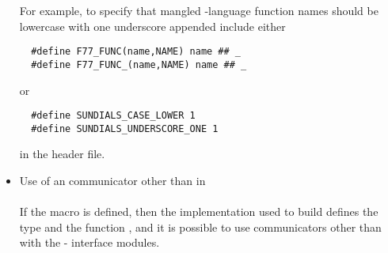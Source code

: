 \begin{itemize}
  For example, to specify that mangled {\C}-language function names
  should be lowercase with one underscore appended include either
\begin{verbatim}
  #define F77_FUNC(name,NAME) name ## _
  #define F77_FUNC_(name,NAME) name ## _
\end{verbatim}
  or
\begin{verbatim}
  #define SUNDIALS_CASE_LOWER 1
  #define SUNDIALS_UNDERSCORE_ONE 1
\end{verbatim}
  in the  header file.

\item Use of an {\mpi} communicator other than  in {\F}\\ \\
  If the macro  is defined, then the
  {\mpi} implementation used to build {\sundials} defines the type
   and the function , and it is
  possible to use {\mpi} communicators other than
   with the {\F}-{\C} interface modules.
\end{itemize}

